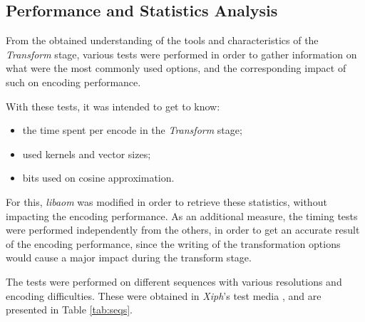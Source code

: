 \subsection{Performance and Statistics Analysis} \label{ssec:performance}

From the obtained understanding of the tools and characteristics of the \emph{Transform} stage, various tests were performed in order to gather information on what were the most commonly used options, and the corresponding impact of such on encoding performance.

With these tests, it was intended to get to know:
\begin{itemize}
    \item the time spent per encode in the \emph{Transform} stage;
    \item used kernels and vector sizes;
    \item bits used on cosine approximation.
\end{itemize}

For this, \emph{libaom} was modified in order to retrieve these statistics, without impacting the encoding performance. As an additional measure, the timing tests were performed independently from the others, in order to get an accurate result of the encoding performance, since the writing of the transformation options would cause a major impact during the transform stage.

The tests were performed on different sequences with various resolutions and encoding difficulties. These were obtained in \emph{Xiph}'s test media \cite{XiphOrgTest}, and are presented in Table \ref{tab:seqs}.

